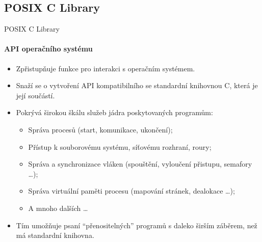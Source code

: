 \documentclass[handout]{beamer}
\begin{document}
\subsection{POSIX C Library}
\begin{frame}{POSIX C Library}
    \framesubtitle{API operačního systému}
    \begin{itemize}
        \item Zpřistupňuje funkce pro interakci s operačním systémem.
        \item Snaží se o vytvoření API kompatibilního se standardní knihovnou C, která je její součástí.
        \item Pokrývá širokou škálu služeb jádra poskytovaných programům:
            \begin{itemize}
                \item Správa procesů (start, komunikace, ukončení);
                \item Přístup k souborovému systému, síťovému rozhraní, roury;
                \item Správa a synchronizace vláken (spouštění, vyloučení přistupu, semafory \ldots);
                \item Správa virtuální paměti procesu (mapování stránek, dealokace \ldots);
                \item A mnoho dalších \ldots
            \end{itemize}
        \item Tím umožňuje psaní ``přenositelných'' programů s daleko širším záběrem, než má standardní knihovna.
    \end{itemize}
\end{frame}
\end{document}
